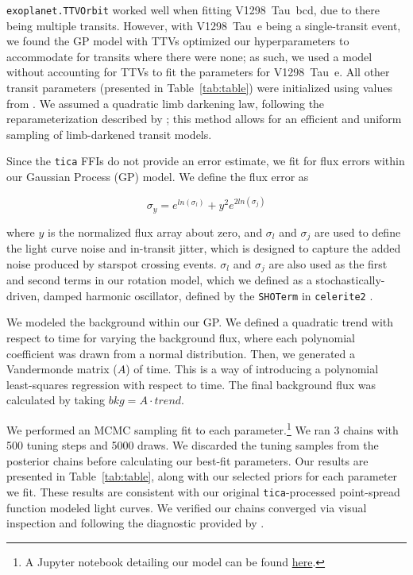 \documentclass[twocolumn]{aastex631}
\newcommand{\planete}{V1298~Tau~e\xspace}
\newcommand{\planetknown}{V1298~Tau~bcd\xspace}
\begin{document}
\texttt{exoplanet.TTVOrbit} worked well when fitting \planetknown, due to there being multiple transits. However, with \planete being a single-transit event, we found the GP model with TTVs optimized our hyperparameters to accommodate for transits where there were none; as such, we used a model without accounting for TTVs to fit the parameters for \planete. All other transit parameters (presented in Table~\ref{tab:table}) were initialized using values from \cite{David2019a}. We assumed a quadratic limb darkening law, following the reparameterization described by \cite{kipping13}; this method allows for an efficient and uniform sampling of limb-darkened transit models.


Since the \texttt{tica} FFIs do not provide an error estimate, we fit for flux errors within our Gaussian Process (GP) model. We define the flux error as

\begin{equation}
    \sigma_y = e^{ln(\sigma_l)} + y^2 e^{2 ln(\sigma_j)}
\end{equation}

where $y$ is the normalized flux array about zero, and $\sigma_l$  and $\sigma_j$ are used to define the light curve noise and in-transit jitter, which is designed to capture the added noise produced by starspot crossing events. $\sigma_l$  and $\sigma_j$ are also used as the first and second terms in our rotation model, which we defined as a stochastically-driven, damped harmonic oscillator, defined by the \texttt{SHOTerm} in \texttt{celerite2} \citep{dfm17}.

We modeled the background within our GP. We defined a quadratic trend with respect to time for varying the background flux, where each polynomial coefficient was drawn from a normal distribution. Then, we generated a Vandermonde matrix ($A$) of time. This is a way of introducing a polynomial least-squares regression with respect to time. The final background flux was calculated by taking $bkg = A \cdot trend$.  

We performed an MCMC sampling fit to each parameter.\footnote{A Jupyter notebook detailing our model can be found \href{https://github.com/afeinstein20/v1298tau\_tess/blob/main/notebooks/TESS\_V1298Tau.ipynb}{here}.} We ran 3 chains with 500 tuning steps and 5000 draws. We discarded the tuning samples from the posterior chains before calculating our best-fit parameters. Our results are presented in Table~\ref{tab:table}, along with our selected priors for each parameter we fit. These results are consistent with our original \texttt{tica}-processed point-spread function modeled light curves. We verified our chains converged via visual inspection and following the diagnostic provided by \cite{Geweke92}.
\end{document}
